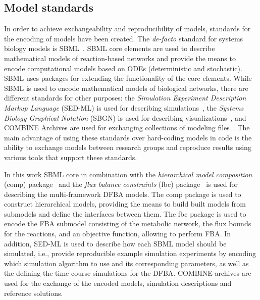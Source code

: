 \documentclass{bioinfo}
\begin{document}
\subsection{Model standards}
In order to achieve exchangeability and reproducibility of models, standards for the encoding of models have been created. The \emph{de-facto} standard for systems biology models is SBML~\citep{SBML}. 
SBML core elements are used to describe mathematical models of reaction-based networks and provide the means to encode computational models based on ODEs (deterministic and stochastic). SBML uses packages for extending the functionality of the core elements. While SBML is used to encode mathematical models of biological networks, there are different standards for other purposes: the \emph{Simulation Experiment Description Markup Language} (SED-ML) is used for describing simulations~\citep{SEDML}, the \emph{Systems Biology Graphical Notation} (SBGN) is used for describing visualizations~\citep{SBGN}, and COMBINE Archives are used for exchanging collections of modeling files~\citep{COMBINE_ARCHIVE}. The main advantage of using these standards over hard-coding models in code is the ability to exchange models between research groups and reproduce results using various tools that support these standards.  

In this work SBML core in combination with the \emph{hierarchical model composition} (comp) package~\citep{SBMLhierarichicall3v1} and the \emph{flux balance constraints} (fbc) package~\citep{SBMLfluxl3v1} is used for describing the multi-framework DFBA models. The comp package is used to construct hierarchical models, providing the means to build built models from submodels and define the interfaces between them. The fbc package is used to encode the FBA submodel consisting of the metabolic network, the flux bounds for the reactions, and an objective function, allowing to perform FBA. In addition, SED-ML is used to describe how each SBML model should be simulated, i.e., provide reproducible example simulation experiments by encoding which simulation algorithm to use and its corresponding parameters, as well as the defining the time course simulations for the DFBA. COMBINE archives are used for the exchange of the encoded models, simulation descriptions and reference solutions.
\end{document}
